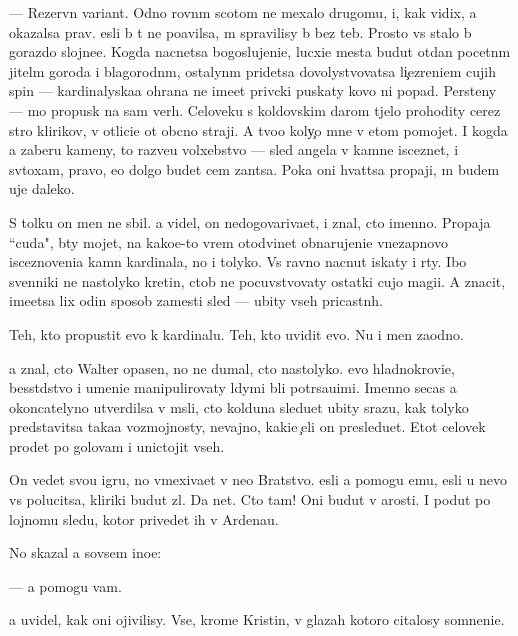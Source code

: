 \documentclass[10pt]{book}
\begin{document}
— Rezervn{\yi}{\y} variant. Odno rovn{\yi}m scotom ne mexalo drugomu, i, kak vidix, {\y}a okazalsa prav. {\Y}esli b{\yi} t{\yi} ne po{\y}avilsa, m{\yi} spravilisy b{\yi} bez teb{\ia}. Prosto vs{\e} stalo b{\yi} gorazdo slojne{\y}e. Kogda nacnetsa bogoslujeni{\y}e, lucxi{\y}e mesta budut otdan{\yi} pocetn{\yi}m jitel{\ia}m goroda i blagorodn{\yi}m, ostalyn{\yi}m pridetsa dovolystvovatsa li{\c}ezreni{\y}em cujih spin — kardinalyska{\y}a ohrana ne ime{\y}et priv{\yi}cki puskaty kovo ni popad{\ia}. Persteny — mo{\y} propusk na sam{\yi}{\y} verh. Celoveku s koldovskim darom t{\ia}jelo prohodity cerez stro{\y} klirikov, v otlici{\y}e ot ob{\yi}cno{\y} straji. A tvo{\y}o koly{\c}o mne v etom pomojet. I kogda {\y}a zaberu kameny, to razve{\y}u volxebstvo — sled angela v kamne isceznet, i sv{\ia}toxam, pravo, {\y}e{\x}o dolgo budet cem zan{\ia}tsa. Poka oni hvat{\ia}tsa propaji, m{\yi} budem uje daleko.

S tolku on men{\ia} ne sbil. {\Y}a videl, on nedogovariva{\y}et, i znal, cto imenno. Propaja ``cuda", b{\yi}ty mojet, na kako{\y}e-to vrem{\ia} otodvinet obnarujeni{\y}e vnezapnovo isceznoveni{\y}a kamn{\ia} kardinala, no i tolyko. Vs{\e} ravno nacnut iskaty i r{\yi}ty. Ibo sv{\ia}{\x}enniki ne nastolyko kretin{\yi}, ctob{\yi} ne pocuvstvovaty ostatki cujo{\y} magi{\y}i. A znacit, ime{\y}etsa lix odin sposob zamesti sled{\yi} — ubity vseh pricastn{\yi}h.

Teh, kto propustit {\y}evo k kardinalu. Teh, kto uvidit {\y}evo. Nu i men{\ia} zaodno.

{\Y}a znal, cto Walter opasen, no ne dumal, cto nastolyko. {\Y}evo hladnokrovi{\y}e, besst{\yi}dstvo i umeni{\y}e manipulirovaty l{\iu}dymi b{\yi}li potr{\ia}sa{\y}u{\x}imi. Imenno se{\y}cas {\y}a okoncatelyno utverdilsa v m{\yi}sli, cto kolduna sledu{\y}et ubity srazu, kak tolyko predstavitsa taka{\y}a vozmojnosty, nevajno, kaki{\y}e {\c}eli on presledu{\y}et. Etot celovek pro{\y}det po golovam i unictojit vseh.

On vedet svo{\y}u igru, no vmexiva{\y}et v ne{\y}o Bratstvo. {\Y}esli {\y}a pomogu {\y}emu, {\y}esli u nevo vs{\e} polucitsa, kliriki budut zl{\yi}. Da net. Cto tam! Oni budut v {\y}arosti. I po{\y}dut po lojnomu sledu, kotor{\yi}{\y} privedet ih v Ardenau.

No skazal {\y}a sovsem ino{\y}e:

— {\Y}a pomogu vam.

{\Y}a uvidel, kak oni ojivilisy. Vse, krome Kristin{\yi}, v glazah kotoro{\y} citalosy somneni{\y}e.
\end{document}
